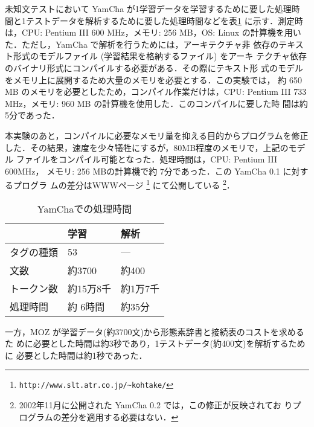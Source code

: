 未知文テストにおいて YamCha が1学習データを学習するために要した処理時
間と1テストデータを解析するために要した処理時間などを表\ref{MorTime} 
に示す．測定時は，CPU: Pentium III 600 MHz，メモリ: 256 MB，OS: Linux 
の計算機を用いた．ただし，YamCha で解析を行うためには，アーキテクチャ非
依存のテキスト形式のモデルファイル (学習結果を格納するファイル) をアーキ
テクチャ依存のバイナリ形式にコンパイルする必要がある．その際にテキスト形
式のモデルをメモリ上に展開するため大量のメモリを必要とする．この実験では，
約 650 MB のメモリを必要としたため，コンパイル作業だけは，CPU: Pentium
III 733 MHz，メモリ: 960 MB の計算機を使用した．このコンパイルに要した時
間は約5分であった．

本実験のあと，コンパイルに必要なメモリ量を抑える目的からプログラムを修正
した．その結果，速度を少々犠牲にするが，80MB程度のメモリで，上記のモデル
ファイルをコンパイル可能となった．処理時間は，CPU: Pentium III 600MHz，
メモリ: 256 MBの計算機で約 7分であった．この YamCha 0.1 に対するプログラ
ムの差分はWWWページ
\footnote{\tt http://www.slt.atr.co.jp/\~{ }kohtake/} にて公開している
\footnote{2002年11月に公開された YamCha 0.2 では，この修正が反映されてお
りプログラムの差分を適用する必要はない．}．

\begin{table}[htb]
 \begin{center}
  \caption{YamChaでの処理時間}
  \begin{tabular}{l|ll} 
\hline
                & 学習     & 解析 \\
\hline
    タグの種類  & 53       & ---   \\ 
    文数       & 約3700    & 約400\\
    トークン数 & 約15万8千 &約1万7千\\ 
    処理時間   & 約 6時間  &約35分\\ 
\hline
  \end{tabular}
  \label{MorTime}
 \end{center}
\end{table}

一方，MOZ が学習データ(約3700文)から形態素辞書と接続表のコストを求めるた
めに必要とした時間は約3秒であり，1テストデータ(約400文)を解析するために
必要とした時間は約1秒であった．


